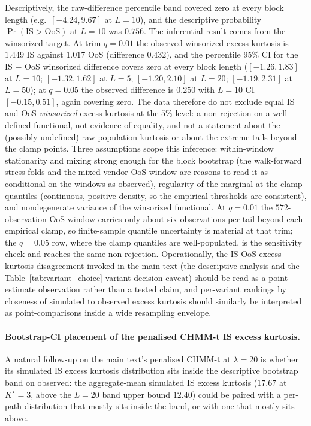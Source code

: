 Descriptively, the raw-difference percentile band covered zero at every block length (e.g.\ $[-4.24, 9.67]$ at $L = 10$), and the descriptive probability $\Pr(\text{IS} > \text{OoS})$ at $L = 10$ was $0.756$. The inferential result comes from the winsorized target. At trim $q = 0.01$ the observed winsorized excess kurtosis is $1.449$ IS against $1.017$ OoS (difference $0.432$), and the percentile $95\%$ CI for the IS $-$ OoS winsorized difference covers zero at every block length ($[-1.26, 1.83]$ at $L = 10$; $[-1.32, 1.62]$ at $L = 5$; $[-1.20, 2.10]$ at $L = 20$; $[-1.19, 2.31]$ at $L = 50$); at $q = 0.05$ the observed difference is $0.250$ with $L = 10$ CI $[-0.15, 0.51]$, again covering zero. The data therefore do not exclude equal IS and OoS \emph{winsorized} excess kurtosis at the $5\%$ level: a non-rejection on a well-defined functional, not evidence of equality, and not a statement about the (possibly undefined) raw population kurtosis or about the extreme tails beyond the clamp points. Three assumptions scope this inference: within-window stationarity and mixing strong enough for the block bootstrap (the walk-forward stress folds and the mixed-vendor OoS window are reasons to read it as conditional on the windows as observed), regularity of the marginal at the clamp quantiles (continuous, positive density, so the empirical thresholds are consistent), and nondegenerate variance of the winsorized functional. At $q = 0.01$ the $572$-observation OoS window carries only about six observations per tail beyond each empirical clamp, so finite-sample quantile uncertainty is material at that trim; the $q = 0.05$ row, where the clamp quantiles are well-populated, is the sensitivity check and reaches the same non-rejection. Operationally, the IS-OoS excess kurtosis disagreement invoked in the main text (the descriptive analysis and the Table~\ref{tab:variant_choice} variant-decision caveat) should be read as a point-estimate observation rather than a tested claim, and per-variant rankings by closeness of simulated to observed excess kurtosis should similarly be interpreted as point-comparisons inside a wide resampling envelope.

\paragraph{Bootstrap-CI placement of the penalised CHMM-t IS excess kurtosis.}
\label{sec:kurtosis_ci_placement}
A natural follow-up on the main text's penalised CHMM-t at $\lambda = 20$ is whether its simulated IS excess kurtosis distribution sits inside the descriptive bootstrap band on observed: the aggregate-mean simulated IS excess kurtosis ($17.67$ at $K^\star = 3$, above the $L = 20$ band upper bound $12.40$) could be paired with a per-path distribution that mostly sits inside the band, or with one that mostly sits above.


